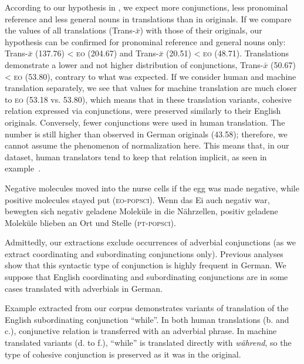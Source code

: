 \documentclass[output=paper]{LSP/langsci}
\begin{document}
According to our hypothesis in , we expect more conjunctions, less pronominal reference and less general nouns in translations than in originals. If we compare the values of all translations (Trans-$\bar{x}$) with those of their originals, our hypothesis can be confirmed for pronominal reference and general nouns only: Trans-$\bar{x}$ (137.76) < \textsc{eo} (204.67) and Trans-$\bar{x}$ (20.51) < \textsc{eo} (48.71). Translations demonstrate a lower and not higher distribution of conjunctions, Trans-$\bar{x}$ (50.67) < \textsc{eo} (53.80), contrary to what was expected. If we consider human and machine translation separately, we see that values for machine translation are much closer to \textsc{eo} (53.18 vs. 53.80), which means that in these translation variants, cohesive relation expressed via conjunctions, were preserved similarly to their English originals. Conversely, fewer conjunctions were used in human translation. The number is still higher than observed in German originals (43.58); therefore, we cannot assume the phenomenon of normalization here. This means that, in our dataset, human translators tend to keep that relation implicit, as seen in example~.



\ea \label{ex:4:3}
\ea Negative molecules moved into the nurse cells if the egg was made negative, while positive molecules stayed put (\textsc{eo}-\textsc{popsci}).
\ex Wenn das Ei auch negativ war, bewegten sich negativ geladene Moleküle in die Nährzellen, positiv geladene Moleküle blieben an Ort und Stelle (\textsc{pt}-\textsc{popsci}).
\z
\z

Admittedly, our extractions exclude occurrences of adverbial conjunctions (as we extract coordinating and subordinating conjunctions only). Previous analyses \citep[e.g.][]{KunzLapshinova2014} show that this syntactic type of conjunction is highly frequent in German. We suppose that English coordinating and subordinating conjunctions are in some cases translated with adverbials in German. 

Example  extracted from our corpus demonstrates variants of translation of the English subordinating conjunction “while”. In both human translations (b. and c.), conjunctive relation is transferred with an adverbial phrase. In machine translated variants (d. to f.), “while” is translated directly with \textit{während}, so the type of cohesive conjunction is preserved as it was in the original.
\end{document}
